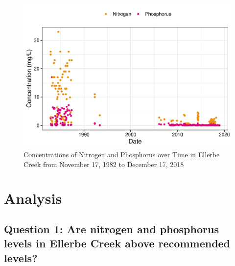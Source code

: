 \documentclass[12pt,]{article}
\begin{document}
\begin{figure}
\centering
\includegraphics{Landman_ENV872_Project_files/figure-latex/Exploratory Analysis Figure 5-1.pdf}
\caption{Concentrations of Nitrogen and Phosphorus over Time in Ellerbe
Creek from November 17, 1982 to December 17, 2018}
\end{figure}

\newpage

\hypertarget{analysis}{%
\section{Analysis}\label{analysis}}

\hypertarget{question-1-are-nitrogen-and-phosphorus-levels-in-ellerbe-creek-above-recommended-levels}{%
\subsection{Question 1: Are nitrogen and phosphorus levels in Ellerbe
Creek above recommended
levels?}\label{question-1-are-nitrogen-and-phosphorus-levels-in-ellerbe-creek-above-recommended-levels}}
\end{document}
